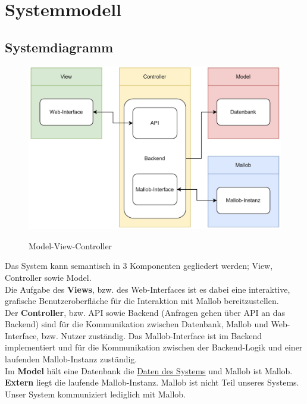 \section{Systemmodell}

\subsection{Systemdiagramm}

\begin{figure}[H]
    \centering
    \includegraphics[width=\textwidth]{images-interface/Diagramme/Systemdiagramm3.jpg} \\
    \caption{Model-View-Controller}
\end{figure}
Das System kann semantisch in 3 Komponenten gegliedert werden; View, Controller sowie Model. \\
Die Aufgabe des \textbf{Views}, bzw. des Web-Interfaces ist es dabei eine interaktive, grafische Benutzeroberfläche für die Interaktion mit Mallob bereitzustellen. \\
Der \textbf{Controller}, bzw. API sowie Backend (Anfragen gehen über API an das Backend) sind für die Kommunikation zwischen Datenbank, Mallob und Web-Interface, bzw. Nutzer zuständig. Das Mallob-Interface ist im Backend implementiert und für die Kommunikation zwischen der Backend-Logik und einer laufenden Mallob-Instanz zuständig.\\
Im \textbf{Model} hält eine Datenbank die \hyperref[PD]{Daten des Systems} und Mallob ist Mallob. \\
\textbf{Extern} liegt die laufende Mallob-Instanz. Mallob ist nicht Teil unseres Systems. Unser System kommuniziert lediglich mit Mallob.

\pagebreak

